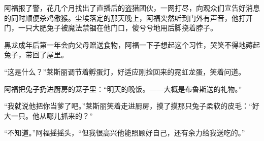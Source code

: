 \documentclass[../main.tex]{subfiles}
\begin{document}
阿福报了警，花几个月找出了直播后的盗猎团伙，一网打尽，向观众们宣告好消息的同时顺便杀鸡儆猴。尘埃落定的那天晚上，阿福突然听到门外有声音，他打开门，一只大肥兔子被魔法禁锢在他门口，傻兮兮地用后脚挠着脖子。

黑龙成年后第一年会向父母赠送食物，阿福一下子想起这个习性，哭笑不得地薅起兔子，带回了屋里。

“这是什么？”莱斯丽调节着孵蛋灯，好适应刚捡回来的霓虹龙蛋，笑着问道。

阿福把兔子扔进厨房的笼子里：“明天的晚饭。——大概是布鲁斯送的礼物。”

“我就说他把你当爹了吧。”莱斯丽笑着走进厨房，摸了摸那只兔子柔软的皮毛：“好大一只。他从哪儿抓来的？”

“不知道。”阿福摇摇头，“但我很高兴他能照顾好自己，还有余力给我送吃的。”

\storyend

\end{document}
